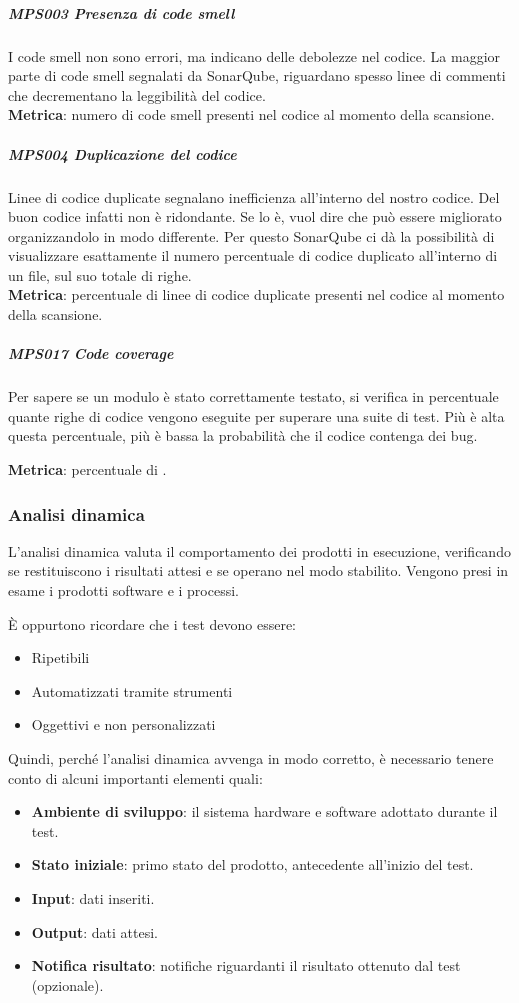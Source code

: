 			\subparagraph{MPS003 Presenza di code smell} \label{presenzacodesmell}
			I code smell non sono errori, ma indicano delle debolezze nel codice.
			La maggior parte di code smell segnalati da SonarQube, riguardano spesso linee di commenti che decrementano la leggibilità del codice.  \\
			\textbf{Metrica}: numero di code smell presenti nel codice al momento della scansione.

			\subparagraph{MPS004 Duplicazione del codice} \label{duplicazionecodice}
			Linee di codice duplicate segnalano inefficienza all'interno del nostro codice.
			Del buon codice infatti non è ridondante.
			Se lo è, vuol dire che può essere migliorato organizzandolo in modo differente.
			Per questo SonarQube ci dà la possibilità di visualizzare esattamente il numero percentuale di codice duplicato all'interno di un file, sul suo totale di righe. \\
			\textbf{Metrica}: percentuale di linee di codice duplicate presenti nel codice al momento della scansione.

            \subparagraph{MPS017 Code coverage} \label{codecoverage}
            Per sapere se un modulo è stato correttamente testato, si verifica in percentuale quante righe di codice vengono eseguite per superare una suite di test. Più è alta questa percentuale, più è bassa la probabilità che il codice contenga dei bug.

            \textbf{Metrica}: percentuale di .

		\subsubsection{Analisi dinamica}\label{AnalisiDinamica}
		L'analisi dinamica valuta il comportamento dei prodotti in esecuzione, verificando se restituiscono i risultati attesi e se operano nel modo stabilito.
		Vengono presi in esame i prodotti software e i processi.

		È oppurtono ricordare che i test devono essere:
		\begin{itemize}
			\item Ripetibili
			\item Automatizzati tramite strumenti
			\item Oggettivi e non personalizzati
		\end{itemize}

		Quindi, perché l'analisi dinamica avvenga in modo corretto, è necessario tenere conto di alcuni importanti elementi quali:
		\begin{itemize}
			\item \textbf{Ambiente di sviluppo}: il sistema hardware e software adottato durante il test.
			\item \textbf{Stato iniziale}: primo stato del prodotto, antecedente all'inizio del test.
			\item \textbf{Input}: dati inseriti.
			\item \textbf{Output}: dati attesi.
			\item \textbf{Notifica risultato}: notifiche riguardanti il risultato ottenuto dal test (opzionale).
		\end{itemize}

